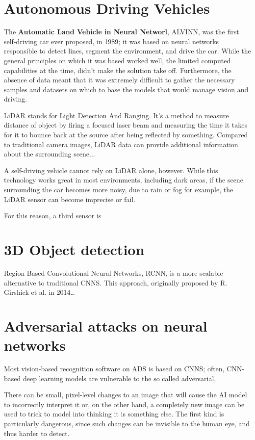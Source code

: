 \newpage
\section{Autonomous Driving Vehicles}
The \textbf{Automatic Land Vehicle in Neural Networl}, ALVINN, was the first self-driving car ever proposed, in 1989; it was based on neural networks responsible to detect lines, segment the environment, and drive the car.
While the general principles on which it was based worked well, the limited computed capabilities at the time, didn't make the solution take off. Furthermore, the absence of data meant that it was extremely difficult to gather the necessary samples and datasets on which to base the models that would manage vision and driving.


LiDAR stands for Light Detection And Ranging. It's a method to measure distance of object by firing a focused laser beam and measuring the time it takes for it to bounce back at the source after being reflected by something.
Compared to traditional camera images, LiDAR data can provide additional information about the surrounding scene...

A self-driving vehicle cannot rely on LiDAR alone, however. While this technology works great in most environments, including dark areas, if the scene surrounding the car becomes more noisy, due to rain or fog for example, the LiDAR sensor can become imprecise or fail.

For this reason, a third sensor is 


\section{3D Object detection}
Region Based Convolutional Neural Networks, RCNN, is a more scalable alternative to traditional CNNS. This approach, originally proposed by R. Girshick et al. \cite{DBLP:conf/cvpr/GirshickDDM14} in 2014\dots







\newpage
\section{Adversarial attacks on neural networks}
Most vision-based recognition software on ADS is based on CNNS; often, CNN-based deep learning models are vulnerable to the so called adversarial, 

There can be small, pixel-level changes to an image that will cause the AI model to incorrectly interpret it or, on the other hand, a completely new image can be used to trick to model into thinking it is something else. The first kind is particularly dangerous, since such changes can be invisible to the human eye, and thus harder to detect.

